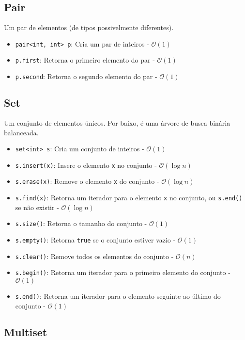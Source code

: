 \documentclass[10pt, a4paper, oneside]{book}
\begin{document}
\subsection{Pair}

Um par de elementos (de tipos possivelmente diferentes).

\begin{itemize}
    \item \texttt{pair<int, int> p}: Cria um par de inteiros - $\mathcal{O}(1)$
    \item \texttt{p.first}: Retorna o primeiro elemento do par - $\mathcal{O}(1)$
    \item \texttt{p.second}: Retorna o segundo elemento do par - $\mathcal{O}(1)$
\end{itemize}

\subsection{Set}

Um conjunto de elementos únicos. Por baixo, é uma árvore de busca binária balanceada.

\begin{itemize}
    \item \texttt{set<int> s}: Cria um conjunto de inteiros - $\mathcal{O}(1)$
    \item \texttt{s.insert(x)}: Insere o elemento \texttt{x} no conjunto - $\mathcal{O}(\log n)$
    \item \texttt{s.erase(x)}: Remove o elemento \texttt{x} do conjunto - $\mathcal{O}(\log n)$
    \item \texttt{s.find(x)}: Retorna um iterador para o elemento \texttt{x} no conjunto, ou \texttt{s.end()} se não existir - $\mathcal{O}(\log n)$
    \item \texttt{s.size()}: Retorna o tamanho do conjunto - $\mathcal{O}(1)$
    \item \texttt{s.empty()}: Retorna \texttt{true} se o conjunto estiver vazio - $\mathcal{O}(1)$
    \item \texttt{s.clear()}: Remove todos os elementos do conjunto - $\mathcal{O}(n)$
    \item \texttt{s.begin()}: Retorna um iterador para o primeiro elemento do conjunto - $\mathcal{O}(1)$
    \item \texttt{s.end()}: Retorna um iterador para o elemento seguinte ao último do conjunto - $\mathcal{O}(1)$
\end{itemize}

\subsection{Multiset}
\end{document}
